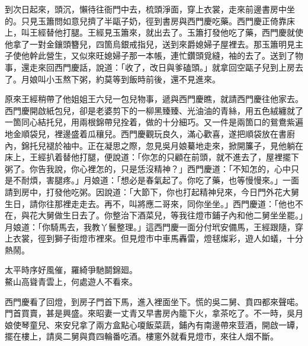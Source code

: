 到次日起來，頭沉，懶待往衙門中去，梳頭淨面，穿上衣裳，走來前邊書房中坐的。只見玉簫問如意兒擠了半甌子奶，徑到書房與西門慶吃藥。西門慶正倚靠床上，叫王經替他打腿。王經見玉簫來，就出去了。玉簫打發他吃了藥，西門慶就使他拿了一對金鑲頭簪兒，四箇烏銀戒指兒，送到來爵媳婦子屋裡去。那玉簫明見主子使他幹此營生，又似來旺媳婦子那一本帳，{}連忙鑽頭覓縫，袖的去了。送到了物事，還走來回西門慶話，說道：「收了，改日與爹磕頭。」就拿回空甌子兒到上房去了。月娘叫小玉熬下粥，約莫等到飯時前後，還不見進來。

原來王經稍帶了他姐姐王六兒一包兒物事，遞與西門慶瞧，就請西門慶往他家去。西門慶開啟紙包兒，卻是老婆剪下的一柳黑臻臻、光油油的青絲，用五色絨纏就了一箇同心結托兒，用兩根錦帶兒拴着，做的十分細巧。{}又一件是兩箇口的鴛鴦紫遍地金順袋兒，裡邊盛着瓜穰兒。西門慶觀玩良久，滿心歡喜，遂把順袋放在書廚內，錦托兒褪於袖中。正在凝思之際，忽見吳月娘驀地走來，掀開簾子，見他躺在床上，王經扒着替他打腿，便說道：「你怎的只顧在前頭，就不進去了，屋裡擺下粥了。你告我說，你心裡怎的，只是恁沒精神？」{}西門慶道：「不知怎的，心中只是不耐煩，害腿疼。」月娘道：「想必是春氣起了。你吃了藥，也等慢慢來。」一面請到房中，打發他吃粥。因說道：「大節下，你也打起精神兒來，今日門外花大舅生日，請你往那裡走走去。再不，叫將應二哥來，同你坐坐。」西門慶道：「他也不在，與花大舅做生日去了。你整治下酒菜兒，等我往燈市鋪子內和他二舅坐坐罷。」月娘道：「你騎馬去，我教丫鬟整理。」這西門慶一面分付玳安備馬，王經跟隨，穿上衣裳，徑到獅子街燈市裡來。但見燈市中車馬轟雷，燈毬燦彩，遊人如蟻，十分熱鬧。

\begin{myquote} 
太平時序好風催，羅綺爭馳鬬錦廻。\\鰲山高聳青雲上，何處遊人不看來。
\end{myquote} 

西門慶看了回燈，到房子門首下馬，進入裡面坐下。慌的吳二舅、賁四都來聲喏。門首買賣，甚是興盛。來昭妻一丈青又早書房內籠下火，拿茶吃了。不一時，吳月娘使琴童兒、來安兒拿了兩方盒點心嗄飯菜蔬，鋪內有南邊帶來荳酒，開啟一罈，擺在樓上，請吳二舅與賁四輪番吃酒。樓窻外就看見燈市，來往人烟不斷。

